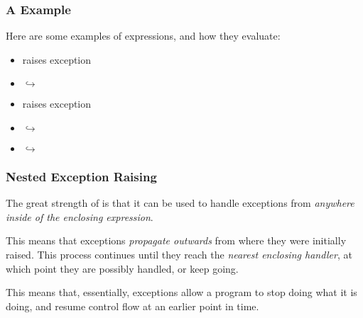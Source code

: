\documentclass[aspectratio=169]{beamer}
\begin{document}
\begin{frame}[fragile]
  \frametitle{A  Example}

  Here are some examples of  expressions, and how they evaluate:

  \pause
  \vspace{\fill}

  \begin{itemize}
    \item {} raises exception 
    \item {} $\hookrightarrow$  
    \item {} raises exception  
    \item {} $\hookrightarrow$  
    \item {} $\hookrightarrow$ 
  \end{itemize}

\end{frame}

\begin{frame}[fragile]
  \frametitle{Nested Exception Raising}

  \rprs

  The great strength of  is that it can be used to handle
  exceptions from \textit{anywhere inside of the enclosing expression}.
  
  \pause
  \vspace{\fill}


  \pause
  \vspace{\fill}

  This means that exceptions \textit{propagate outwards} from where
  they were initially raised. This process continues until they reach
  the \textit{nearest enclosing handler}, at which point they are
  possibly handled, or keep going.

  \pause
  \vspace{\fill}

  This means that, essentially, exceptions allow a program to stop
  doing what it is doing, and resume control flow at an earlier point
  in time.
\end{frame}
\end{document}
